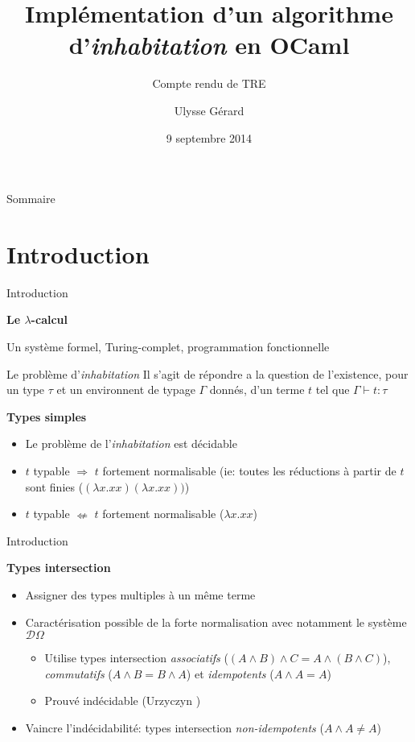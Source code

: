 \documentclass{beamer}
\title{Implémentation  d'un algorithme d'\emph{inhabitation} en OCaml}
\subtitle{Compte rendu de TRE}
\author{Ulysse Gérard}
\institute{Université Denis Diderot, Paris 7\\TRE encadré par Delia Kesner (PPS)}
\date{9 septembre 2014}
\newcommand\heading[1]{%
  \par\bigskip
  {\Large\bfseries#1}\par\smallskip}
\begin{document}
    
    \begin{frame}
        \titlepage
    \end{frame}
    
    \begin{frame}{Sommaire}
        \tableofcontents
    \end{frame}
    
    \section{Introduction}
    \begin{frame}{Introduction}
        \heading{Le $\lambda$-calcul}
        Un système formel, Turing-complet, programmation fonctionnelle
        \begin{block}{Le problème d'\emph{inhabitation}}
        Il s'agit de répondre a la question de l'existence, pour un type $\tau$ et un environnent de typage $\Gamma$ donnés, d'un terme $t$ tel que $\Gamma\vdash t:\tau$
        \end{block}
        \heading{Types simples}
        \begin{itemize}
            \item Le problème de l'\emph{inhabitation} est décidable \cite{Ben}
            \item $t$ typable $\Rightarrow$ $t$ fortement normalisable (ie: toutes les réductions à partir de $t$ sont finies ($(\lambda x.xx)(\lambda x.xx))$)
            \item $t$ typable $\nLeftarrow$ $t$ fortement normalisable ($\lambda x.xx$)
        \end{itemize}
    \end{frame}
        
    \begin{frame}{Introduction}
    \heading{Types intersection}
    \begin{itemize}
    \item Assigner des types multiples à un même terme
    \item Caractérisation possible de la forte normalisation avec notamment le système $\mathcal{D}\Omega$ \cite{coppo}
        \begin{itemize}
        \item Utilise types intersection \emph{associatifs} ($(A\wedge B)\wedge C = A\wedge (B\wedge C)$), \emph{commutatifs} ($A\wedge B=B\wedge A$) et \emph{idempotents} ($A\wedge A = A$)
        \item Prouvé indécidable (Urzyczyn \cite{Urz})
        \end{itemize}
    
    
    \item Vaincre l'indécidabilité: types intersection \emph{non-idempotents} ($A\wedge A \neq A$)
    \end{itemize}
    \end{frame}
    
\end{document}
